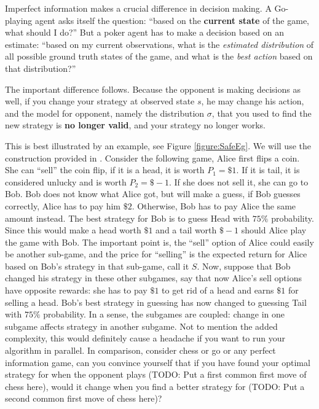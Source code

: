 \documentclass[10pt,a4paper]{article}
\begin{document}
Imperfect information makes a crucial difference in decision making. A Go-playing agent asks itself the question: ``based on the \textbf{current state} of the game, what should I do?'' But a poker agent has to make a decision based on an estimate: ``based on my current observations, what is the \textit{estimated distribution} of all possible ground truth states of the game, and what is the \textit{best action} based on that distribution?'' 

 The important difference follows. Because the opponent is making decisions as well, if you change your strategy at observed state $s$, he may change his action, and the model for opponent, namely the distribution $\sigma$, that you used to find the new strategy is \textbf{no longer valid}, and your strategy no longer works. 

This is best illustrated by an example, see Figure \ref{figure:SafeEg}. We will use the construction provided in \cite{brown2017safe}. Consider the following game, Alice first flips a coin. She can ``sell'' the coin flip, if it is a head, it is worth $P_1 = \$ 1$. If it is tail, it is considered unlucky and is worth $P_2 = \$ -1$. If she does not sell it, she can go to Bob. Bob does not know what Alice got, but will make a guess, if Bob guesses correctly, Alice has to pay him $\$ 2$. Otherwise, Bob has to pay Alice the same amount instead. The best strategy for Bob is to guess Head with $75\%$ probability. Since this would make a head worth $\$ 1$ and a tail worth $\$ -1$ should Alice play the game with Bob. The important point is, the ``sell'' option of Alice could easily be another sub-game, and the price for ``selling'' is the expected return for Alice based on Bob's strategy in that sub-game, call it $S$. Now, suppose that Bob changed his strategy in these other subgames, say that now Alice's sell options have opposite rewards: she has to pay $\$1$ to get rid of a head and earns $\$1$ for selling a head. Bob's best strategy in guessing has now changed to guessing Tail with $75\%$ probability. In a sense, the subgames are coupled: change in one subgame affects strategy in another subgame. Not to mention the added complexity, this would definitely cause a headache if you want to run your algorithm in parallel. In comparison, consider chess or go or any perfect information game, can you convince yourself that if you have found your optimal strategy for when the opponent plays (TODO: Put a first common first move of chess here), would it change when you find a better strategy for (TODO: Put a second common first move of chess here)? 
\end{document}
